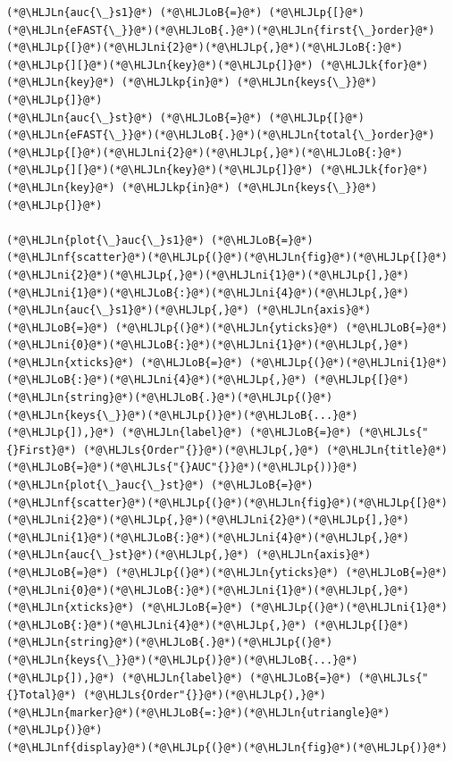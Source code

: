 \documentclass[12pt,a4paper]{article}
\newcommand{\HLJLk}[1]{\textcolor[RGB]{148,91,176}{\textbf{#1}}}
\newcommand{\HLJLkp}[1]{\textcolor[RGB]{148,91,176}{\textbf{#1}}}
\newcommand{\HLJLn}[1]{#1}
\newcommand{\HLJLnf}[1]{\textcolor[RGB]{66,102,213}{#1}}
\newcommand{\HLJLs}[1]{\textcolor[RGB]{201,61,57}{#1}}
\newcommand{\HLJLni}[1]{\textcolor[RGB]{59,151,46}{#1}}
\newcommand{\HLJLoB}[1]{\textcolor[RGB]{102,102,102}{\textbf{#1}}}
\newcommand{\HLJLp}[1]{#1}
\begin{document}
\begin{lstlisting}
(*@\HLJLn{auc{\_}s1}@*) (*@\HLJLoB{=}@*) (*@\HLJLp{[}@*)(*@\HLJLn{eFAST{\_}}@*)(*@\HLJLoB{.}@*)(*@\HLJLn{first{\_}order}@*)(*@\HLJLp{[}@*)(*@\HLJLni{2}@*)(*@\HLJLp{,}@*)(*@\HLJLoB{:}@*)(*@\HLJLp{][}@*)(*@\HLJLn{key}@*)(*@\HLJLp{]}@*) (*@\HLJLk{for}@*) (*@\HLJLn{key}@*) (*@\HLJLkp{in}@*) (*@\HLJLn{keys{\_}}@*)(*@\HLJLp{]}@*)
(*@\HLJLn{auc{\_}st}@*) (*@\HLJLoB{=}@*) (*@\HLJLp{[}@*)(*@\HLJLn{eFAST{\_}}@*)(*@\HLJLoB{.}@*)(*@\HLJLn{total{\_}order}@*)(*@\HLJLp{[}@*)(*@\HLJLni{2}@*)(*@\HLJLp{,}@*)(*@\HLJLoB{:}@*)(*@\HLJLp{][}@*)(*@\HLJLn{key}@*)(*@\HLJLp{]}@*) (*@\HLJLk{for}@*) (*@\HLJLn{key}@*) (*@\HLJLkp{in}@*) (*@\HLJLn{keys{\_}}@*)(*@\HLJLp{]}@*)

(*@\HLJLn{plot{\_}auc{\_}s1}@*) (*@\HLJLoB{=}@*) (*@\HLJLnf{scatter}@*)(*@\HLJLp{(}@*)(*@\HLJLn{fig}@*)(*@\HLJLp{[}@*)(*@\HLJLni{2}@*)(*@\HLJLp{,}@*)(*@\HLJLni{1}@*)(*@\HLJLp{],}@*) (*@\HLJLni{1}@*)(*@\HLJLoB{:}@*)(*@\HLJLni{4}@*)(*@\HLJLp{,}@*) (*@\HLJLn{auc{\_}s1}@*)(*@\HLJLp{,}@*) (*@\HLJLn{axis}@*) (*@\HLJLoB{=}@*) (*@\HLJLp{(}@*)(*@\HLJLn{yticks}@*) (*@\HLJLoB{=}@*) (*@\HLJLni{0}@*)(*@\HLJLoB{:}@*)(*@\HLJLni{1}@*)(*@\HLJLp{,}@*) (*@\HLJLn{xticks}@*) (*@\HLJLoB{=}@*) (*@\HLJLp{(}@*)(*@\HLJLni{1}@*)(*@\HLJLoB{:}@*)(*@\HLJLni{4}@*)(*@\HLJLp{,}@*) (*@\HLJLp{[}@*)(*@\HLJLn{string}@*)(*@\HLJLoB{.}@*)(*@\HLJLp{(}@*)(*@\HLJLn{keys{\_}}@*)(*@\HLJLp{)}@*)(*@\HLJLoB{...}@*)(*@\HLJLp{]),}@*) (*@\HLJLn{label}@*) (*@\HLJLoB{=}@*) (*@\HLJLs{"{}First}@*) (*@\HLJLs{Order"{}}@*)(*@\HLJLp{,}@*) (*@\HLJLn{title}@*)(*@\HLJLoB{=}@*)(*@\HLJLs{"{}AUC"{}}@*)(*@\HLJLp{))}@*)
(*@\HLJLn{plot{\_}auc{\_}st}@*) (*@\HLJLoB{=}@*) (*@\HLJLnf{scatter}@*)(*@\HLJLp{(}@*)(*@\HLJLn{fig}@*)(*@\HLJLp{[}@*)(*@\HLJLni{2}@*)(*@\HLJLp{,}@*)(*@\HLJLni{2}@*)(*@\HLJLp{],}@*) (*@\HLJLni{1}@*)(*@\HLJLoB{:}@*)(*@\HLJLni{4}@*)(*@\HLJLp{,}@*) (*@\HLJLn{auc{\_}st}@*)(*@\HLJLp{,}@*) (*@\HLJLn{axis}@*) (*@\HLJLoB{=}@*) (*@\HLJLp{(}@*)(*@\HLJLn{yticks}@*) (*@\HLJLoB{=}@*) (*@\HLJLni{0}@*)(*@\HLJLoB{:}@*)(*@\HLJLni{1}@*)(*@\HLJLp{,}@*) (*@\HLJLn{xticks}@*) (*@\HLJLoB{=}@*) (*@\HLJLp{(}@*)(*@\HLJLni{1}@*)(*@\HLJLoB{:}@*)(*@\HLJLni{4}@*)(*@\HLJLp{,}@*) (*@\HLJLp{[}@*)(*@\HLJLn{string}@*)(*@\HLJLoB{.}@*)(*@\HLJLp{(}@*)(*@\HLJLn{keys{\_}}@*)(*@\HLJLp{)}@*)(*@\HLJLoB{...}@*)(*@\HLJLp{]),}@*) (*@\HLJLn{label}@*) (*@\HLJLoB{=}@*) (*@\HLJLs{"{}Total}@*) (*@\HLJLs{Order"{}}@*)(*@\HLJLp{),}@*) (*@\HLJLn{marker}@*)(*@\HLJLoB{=:}@*)(*@\HLJLn{utriangle}@*)(*@\HLJLp{)}@*)
(*@\HLJLnf{display}@*)(*@\HLJLp{(}@*)(*@\HLJLn{fig}@*)(*@\HLJLp{)}@*)
\end{lstlisting}
\end{document}
